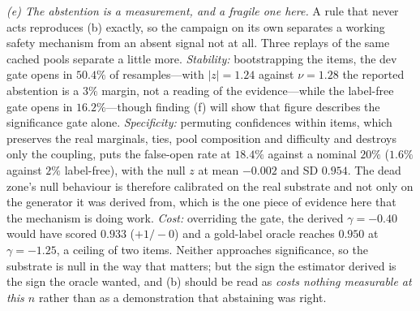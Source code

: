 \documentclass{article}
\begin{document}
\emph{(e) The abstention is a measurement, and a fragile one here.} A rule that
never acts reproduces (b) exactly, so the campaign on its own separates a
working safety mechanism from an absent signal not at all. Three replays of the
same cached pools separate a little more. \emph{Stability:} bootstrapping the
items, the dev gate opens in $50.4\%$ of resamples---with $|z|=1.24$ against
$\nu=1.28$ the reported abstention is a $3\%$ margin, not a reading of the
evidence---while the label-free gate opens in $16.2\%$---though finding (f) will show
that figure describes the significance gate alone. \emph{Specificity:} permuting confidences within items, which preserves the
real marginals, ties, pool composition and difficulty and destroys only the
coupling, puts the false-open rate at $18.4\%$ against a nominal $20\%$
($1.6\%$ against $2\%$ label-free), with the null $z$ at mean $-0.002$ and SD
$0.954$. The dead zone's null behaviour is therefore calibrated on the real
substrate and not only on the generator it was derived from, which is the one
piece of evidence here that the mechanism is doing work. \emph{Cost:}
overriding the gate, the derived $\gamma=-0.40$ would have scored $0.933$
($+1/-0$) and a gold-label oracle reaches $0.950$ at $\gamma=-1.25$, a ceiling
of two items. Neither approaches significance, so the substrate is null in the
way that matters; but the sign the estimator derived is the sign the oracle
wanted, and (b) should be read as \emph{costs nothing measurable at this $n$}
rather than as a demonstration that abstaining was right.
\end{document}
